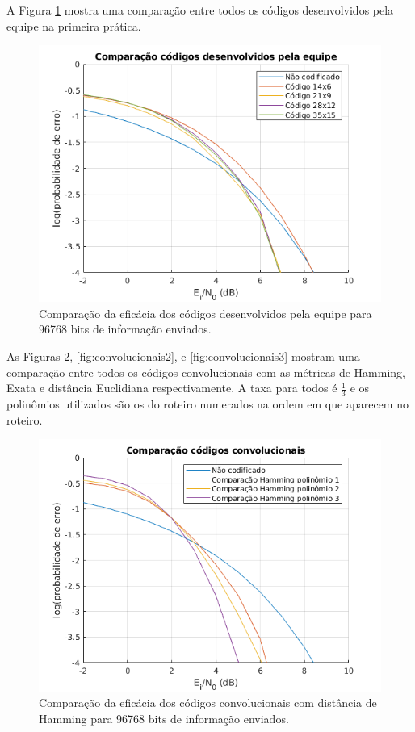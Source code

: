 A Figura \ref{fig:proprios} mostra uma comparação entre todos os códigos desenvolvidos pela equipe na primeira prática.

\begin{figure}[ht]
	\centering
	\captionsetup{justification=centering}
	\includegraphics[scale=0.45]{floats/proprios.png}
	\caption{\label{fig:proprios}Comparação da eficácia dos códigos desenvolvidos pela equipe para 96768 bits de informação enviados.}
\end{figure}

As Figuras \ref{fig:convolucionais1}, \ref{fig:convolucionais2}, e \ref{fig:convolucionais3} mostram uma comparação entre todos os códigos convolucionais com as métricas de Hamming, Exata e distância Euclidiana respectivamente. A taxa para todos é $\frac{1}{3}$ e os polinômios utilizados são os do roteiro numerados na ordem em que aparecem no roteiro.

\begin{figure}[ht]
	\centering
	\captionsetup{justification=centering}
	\includegraphics[scale=0.45]{floats/conv1.png}
	\caption{\label{fig:convolucionais1}Comparação da eficácia dos códigos convolucionais com distância de Hamming para 96768 bits de informação enviados.}
\end{figure}


